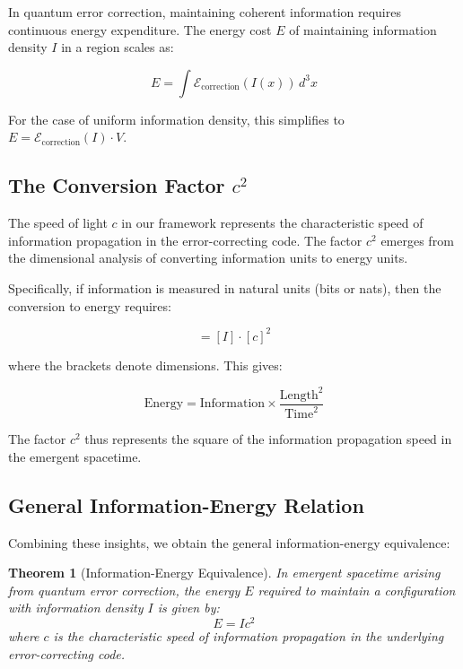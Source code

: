 \documentclass[12pt]{article}
\newtheorem{theorem}{Theorem}
\begin{document}
In quantum error correction, maintaining coherent information requires continuous energy expenditure. The energy cost $E$ of maintaining information density $I$ in a region scales as:

\begin{equation}
E = \int \mathcal{E}_{\text{correction}}(I(x)) \, d^3x
\end{equation}

For the case of uniform information density, this simplifies to $E = \mathcal{E}_{\text{correction}}(I) \cdot V$.

\subsection{The Conversion Factor $c^2$}

The speed of light $c$ in our framework represents the characteristic speed of information propagation in the error-correcting code. The factor $c^2$ emerges from the dimensional analysis of converting information units to energy units.

Specifically, if information is measured in natural units (bits or nats), then the conversion to energy requires:

\begin{equation}
[E] = [I] \cdot [c]^2
\end{equation}

where the brackets denote dimensions. This gives:

\begin{equation}
\text{Energy} = \text{Information} \times \frac{\text{Length}^2}{\text{Time}^2}
\end{equation}

The factor $c^2$ thus represents the square of the information propagation speed in the emergent spacetime.

\subsection{General Information-Energy Relation}

Combining these insights, we obtain the general information-energy equivalence:

\begin{theorem}[Information-Energy Equivalence]
In emergent spacetime arising from quantum error correction, the energy $E$ required to maintain a configuration with information density $I$ is given by:
\begin{equation}
E = Ic^2
\end{equation}
where $c$ is the characteristic speed of information propagation in the underlying error-correcting code.
\end{theorem}
\end{document}
